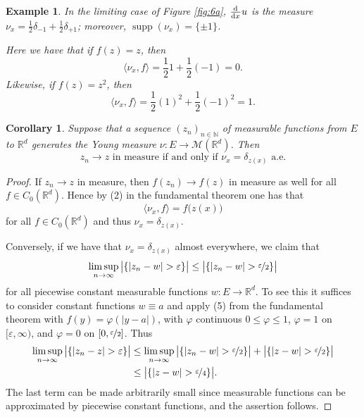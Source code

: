\documentclass[a4paper,doc,11pt]{article}
\newtheorem{corollary}{Corollary}[theorem]
\newtheorem{example}[theorem]{Example}
\newcommand{\R}{\mathbb{R}}
\newcommand{\N}{\mathbb{N}}
\DeclareMathOperator{\supp}{supp}
\begin{document}
\begin{example}
    In the limiting case of Figure \ref{fig:6a}, \(\od{ }{x} u\) is the measure \( \nu_x = \frac 1 2 \delta_{-1} + \frac 1 2 \delta_{+1}\); moreover,  \(\supp(\nu_x) = \{\pm 1\}\). 
    
    Here we have that if \( f(z) = z\), then
    \[
        \langle \nu_x,f \rangle = \frac{1}{2} 1 + \frac{1}{2} (-1) = 0.
    \]
    Likewise, if \( f(z) = z^2\), then
    \[
        \langle \nu_x,f \rangle = \frac{1}{2} (1)^2 + \frac{1}{2} (-1)^2 = 1.
    \]
\end{example}

\begin{corollary}
    Suppose that a sequence \((z_n)_{n\in \N}\) of measurable functions from \(E\) to \(\R^d\) generates the Young measure \( \nu: E \to \mathcal{M}(\R^d)\). Then 
    \[
        z_n \to z \text{ in measure if and only if } \nu_x = \delta_{z(x)} \text{ a.e.}
    \]
\end{corollary}
\begin{proof}
    If \(z_n \to z\) in measure, then \( f(z_n) \to f(z)\) in measure as well for all \( f \in C_0(\R^d)\). Hence by (2) in the fundamental theorem one has that
    \[
        \langle \nu_x, f\rangle = f\big( z(x) \big)
    \]
    for all \( f \in C_0(\R^d)\) and thus \(\nu_x = \delta_{z(x)}\).
    
    Conversely, if we have that \(\nu_x = \delta_{z(x)}\) almost everywhere, we claim that
    \[
        \limsup_{n\to \infty} \big| \{|z_n -w | >\varepsilon\} \big|
        \leq 
        \big| \{|z_n -w | > \nicefrac{\varepsilon}{2}\} \big|
    \]
    for all piecewise constant measurable functions \(w:E\to \R^d\). To see this it suffices to consider constant functions \(w\equiv a\) and apply (5) from the fundamental theorem with \(f(y) = \varphi(|y-a|)\), with \(\varphi\) continuous \(0\leq \varphi \leq 1\), \(\varphi = 1\) on \([\varepsilon,\infty)\), and \(\varphi = 0\) on \([0,\nicefrac{\varepsilon}{2}]\). Thus
    \begin{align*}
        \limsup_{n\to \infty} \big| \{|z_n -z | >\varepsilon\} \big|
        &\leq
        \limsup_{n\to \infty} \big| \{|z_n -w | >\nicefrac{\varepsilon}{2}\} \big|
        + \big| \{|z -w | > \nicefrac{\varepsilon}{2}\} \big|
        \\
        &\leq 
        \big| \{|z -w | > \nicefrac{\varepsilon}{4}\} \big|.
    \end{align*}
    The last term can be made arbitrarily small since measurable functions can be approximated by piecewise constant functions, and the assertion follows.
\end{proof}
\end{document}
